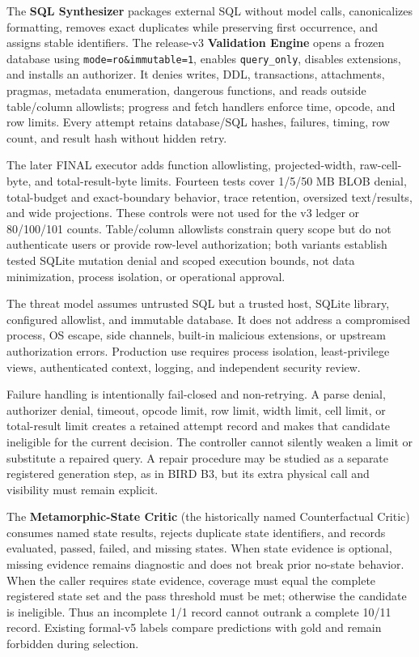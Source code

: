 \documentclass[applsci,article,submit,moreauthors]{Definitions/mdpi}
\begin{document}
The \textbf{SQL Synthesizer} packages external SQL without model calls, canonicalizes formatting, removes exact duplicates while preserving first occurrence, and assigns stable identifiers. The release-v3 \textbf{Validation Engine} opens a frozen database using \texttt{mode=ro\&immutable=1}, enables \texttt{query\_only}, disables extensions, and installs an authorizer. It denies writes, DDL, transactions, attachments, pragmas, metadata enumeration, dangerous functions, and reads outside table/column allowlists; progress and fetch handlers enforce time, opcode, and row limits. Every attempt retains database/SQL hashes, failures, timing, row count, and result hash without hidden retry.

The later FINAL executor adds function allowlisting, projected-width, raw-cell-byte, and total-result-byte limits. Fourteen tests cover 1/5/50 MB BLOB denial, total-budget and exact-boundary behavior, trace retention, oversized text/results, and wide projections. These controls were not used for the v3 ledger or 80/100/101 counts. Table/column allowlists constrain query scope but do not authenticate users or provide row-level authorization; both variants establish tested SQLite mutation denial and scoped execution bounds, not data minimization, process isolation, or operational approval.

The threat model assumes untrusted SQL but a trusted host, SQLite library, configured allowlist, and immutable database. It does not address a compromised process, OS escape, side channels, built-in malicious extensions, or upstream authorization errors. Production use requires process isolation, least-privilege views, authenticated context, logging, and independent security review.

Failure handling is intentionally fail-closed and non-retrying. A parse denial, authorizer denial, timeout, opcode limit, row limit, width limit, cell limit, or total-result limit creates a retained attempt record and makes that candidate ineligible for the current decision. The controller cannot silently weaken a limit or substitute a repaired query. A repair procedure may be studied as a separate registered generation step, as in BIRD B3, but its extra physical call and visibility must remain explicit.

The \textbf{Metamorphic-State Critic} (the historically named Counterfactual Critic) consumes named state results, rejects duplicate state identifiers, and records evaluated, passed, failed, and missing states. When state evidence is optional, missing evidence remains diagnostic and does not break prior no-state behavior. When the caller requires state evidence, coverage must equal the complete registered state set and the pass threshold must be met; otherwise the candidate is ineligible. Thus an incomplete 1/1 record cannot outrank a complete 10/11 record. Existing formal-v5 labels compare predictions with gold and remain forbidden during selection.
\end{document}
